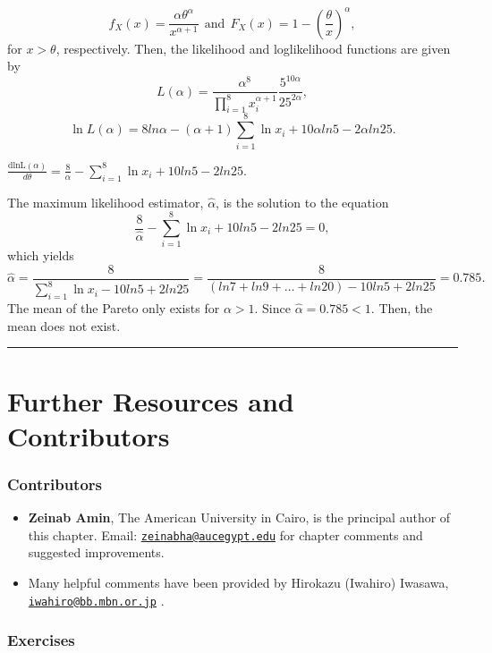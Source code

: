 \documentclass[]{book}
\providecommand{\tightlist}{%
  \setlength{\itemsep}{0pt}\setlength{\parskip}{0pt}}
\theoremstyle{definition}
\theoremstyle{definition}
\theoremstyle{definition}
\theoremstyle{remark}
\begin{document}
\[f_{X}\left( x \right) = \frac{\alpha\theta^{\alpha}}{x^{\alpha + 1}} \ \ \text{and} \ \ F_{X}\left( x \right) = 1 - \left( \frac{\theta}{x} \right)^{\alpha},\]
for \(x > \theta\), respectively. Then, the likelihood and loglikelihood
functions are given by
\[L\left( \alpha \right) = \frac{\alpha^{8}}{\prod_{i = 1}^{8}x_{i}^{\alpha + 1}}\frac{5^{10\alpha}}{25^{2\alpha}},\]
\[\ln L \left( \alpha \right) = 8ln\alpha - \left( \alpha + 1 \right)\sum_{i = 1}^{8}{\ln x_{i}} + 10\alpha ln5 - 2\alpha ln25.\]

\(\frac{\text{dlnL}\left( \alpha \right)}{d \theta} = \frac{8}{\alpha} - \sum_{i = 1}^{8}{\ln x_{i}} + 10ln5 - 2ln25\).

The maximum likelihood estimator, \(\hat{\alpha}\), is the solution to
the equation
\[\frac{8}{\hat{\alpha}} - \sum_{i = 1}^{8}{\ln x_{i}} + 10ln5 - 2ln25 = 0,\]which
yields
\[\hat{\alpha} = \frac{8}{\sum_{i = 1}^{8}{\ln x_{i}} - 10ln5 + 2ln25} = \frac{8}{(ln7 + ln9 + \ldots + ln20) - 10ln5 + 2ln25} = 0.785.\]
The mean of the Pareto only exists for \(\alpha > 1\). Since
\(\hat{\alpha} = 0.785 < 1\). Then, the mean does not exist.

\begin{center}\rule{0.5\linewidth}{\linethickness}\end{center}

\section{Further Resources and
Contributors}\label{LM-further-reading-and-resources}

\subsubsection*{Contributors}\label{contributors-2}

\begin{itemize}
\tightlist
\item
  \textbf{Zeinab Amin}, The American University in Cairo, is the
  principal author of this chapter. Email:
  \href{mailto:zeinabha@aucegypt.edu}{\nolinkurl{zeinabha@aucegypt.edu}}
  for chapter comments and suggested improvements.
\item
  Many helpful comments have been provided by Hirokazu (Iwahiro)
  Iwasawa,
  \href{mailto:iwahiro@bb.mbn.or.jp}{\nolinkurl{iwahiro@bb.mbn.or.jp}} .
\end{itemize}

\subsubsection*{Exercises}\label{exercises-1}
\end{document}
